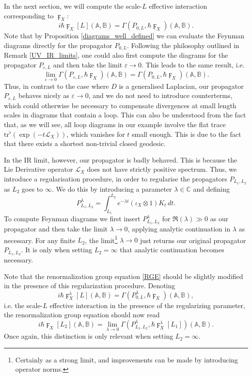 \documentclass[reqno]{amsart}
\theoremstyle{definition}
\theoremstyle{remark}
\renewcommand{\epsilon}{\varepsilon}
\newcommand{\A}{\mathbb{A}}
\newcommand{\B}{\mathbb{B}}
\newcommand{\h}{\hbar}
\renewcommand{\L}{\mathcal{L}}
\newcommand{\tr}{\mathrm{tr}^\flat}
\begin{document}
In the next section, we will compute the scale-$L$ effective interaction corresponding to $\digamma_X$:
$$i\h \digamma_X[L](\A,\B) = \Gamma(P_{0,L},\h \digamma_X)(\A,\B).$$
Note that by Proposition \ref{diagrams_well_defined} we can evaluate the Feynman diagrams directly for the propagator $P_{0,L}$. Following the philosophy outlined in Remark \ref{UV_IR_limits}, one could also first compute the diagrams for the propagator $P_{\epsilon,L}$ and then take the limit $\epsilon\to 0$. This leads to the same result, i.e.
$$\lim_{\epsilon\to 0}\Gamma(P_{\epsilon,L},\h \digamma_X)(\A,\B) = \Gamma(P_{0,L},\h \digamma_X)(\A,\B).$$
Thus, in contrast to the case where $D$ is a generalised Laplacian, our propagator $P_{\epsilon,L}$ behaves nicely as $\epsilon \to 0$, and we do not need to introduce counterterms, which could otherwise be necessary to compensate divergences at small length scales in diagrams that contain a loop. This can also be understood from the fact that, as we will see, all loop diagrams in our example involve the flat trace $\tr(\exp(-t\L_X))$, which vanishes for $t$ small enough. This is due to the fact that there exists a shortest non-trivial closed geodesic.

In the IR limit, however, our propagator is badly behaved. This is because the Lie Derivative operator $\L_X$ does not have strictly positive spectrum. Thus, we introduce a regularisation procedure, in order to regularise the propagators $P_{L_1,L_2}$ as $L_2$ goes to $\infty$. We do this by introducing a parameter $\lambda\in\mathbb{C}$ and defining
$$P_{L_1,L_2}^\lambda = \int_{L_1}^{L_2} e^{-\lambda t}(\iota_X\otimes 1)K_t\,dt .$$ 
To compute Feynman diagrams we first insert $P_{L_1,L_2}^\lambda$ for $\Re(\lambda) \gg 0$ as our propagator and then take the limit $\lambda\to 0$, applying analytic continuation in $\lambda$ as necessary. For any finite $L_2$, the limit\footnote{Certainly as a strong limit, and improvements can be made by introducing operator norms.} $\lambda\to 0$ just returns our original propagator $P_{L_1,L_2}$. It is only when setting $L_2 =\infty$ that analytic continuation becomes necessary.

\begin{rmk}
Note that the renormalization group equation \eqref{RGE} should be slightly modified in the presence of this regularization procedure. Denoting
$$i\h \digamma_X^\lambda[L](\A,\B) = \Gamma(P^\lambda_{0,L},\h \digamma_X)(\A,\B),$$
i.e. the scale-$L$ effective interaction in the presence of the regularizing parameter, the renormalization group equation should now read
$$i\h \digamma_X[L_2](\A,\B) = \lim_{\lambda\to 0}\Gamma(P^\lambda_{L_1,L_2},\h \digamma_X^\lambda[L_1])(\A,\B).$$
Once again, this distinction is only relevant when setting $L_2=\infty$.
\end{rmk}
\end{document}
